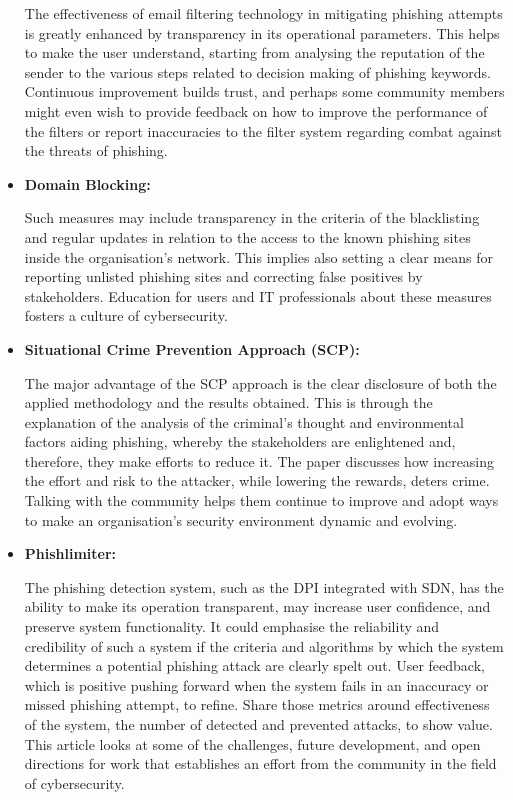\begin{itemize}
    The effectiveness of email filtering technology in mitigating phishing attempts is greatly enhanced by transparency in its operational parameters. This helps to make the user understand, starting from analysing the reputation of the sender to the various steps related to decision making of phishing keywords. Continuous improvement builds trust, and perhaps some community members might even wish to provide feedback on how to improve the performance of the filters or report inaccuracies to the filter system regarding combat against the threats of phishing.

    \item \textbf{Domain Blocking:} 

    Such measures may include transparency in the criteria of the blacklisting and regular updates in relation to the access to the known phishing sites inside the organisation's network. This implies also setting a clear means for reporting unlisted phishing sites and correcting false positives by stakeholders. Education for users and IT professionals about these measures fosters a culture of cybersecurity.

    \item \textbf{Situational Crime Prevention Approach (SCP):}

    The major advantage of the SCP approach is the clear disclosure of both the applied methodology and the results obtained. This is through the explanation of the analysis of the criminal's thought and environmental factors aiding phishing, whereby the stakeholders are enlightened and, therefore, they make efforts to reduce it. The paper discusses how increasing the effort and risk to the attacker, while lowering the rewards, deters crime. Talking with the community helps them continue to improve and adopt ways to make an organisation's security environment dynamic and evolving.

    \item \textbf{Phishlimiter:}

    The phishing detection system, such as the DPI integrated with SDN, has the ability to make its operation transparent, may increase user confidence, and preserve system functionality. It could emphasise the reliability and credibility of such a system if the criteria and algorithms by which the system determines a potential phishing attack are clearly spelt out. User feedback, which is positive pushing forward when the system fails in an inaccuracy or missed phishing attempt, to refine. Share those metrics around effectiveness of the system, the number of detected and prevented attacks, to show value. This article looks at some of the challenges, future development, and open directions for work that establishes an effort from the community in the field of cybersecurity.

\end{itemize}


